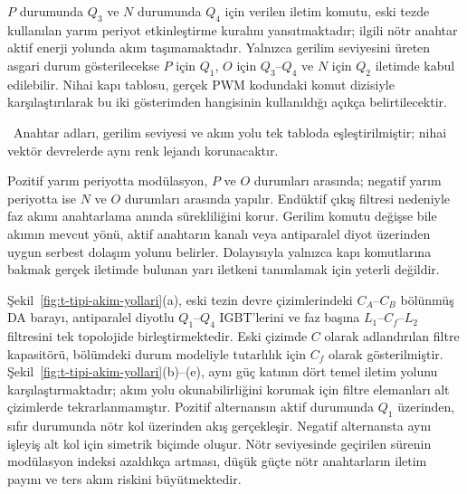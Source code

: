 $P$ durumunda $Q_3$ ve $N$ durumunda $Q_4$ için verilen iletim komutu, eski tezde kullanılan yarım periyot etkinleştirme kuralını yansıtmaktadır; ilgili nötr anahtar aktif enerji yolunda akım taşımamaktadır. Yalnızca gerilim seviyesini üreten asgari durum gösterilecekse $P$ için $Q_1$, $O$ için $Q_3$--$Q_4$ ve $N$ için $Q_2$ iletimde kabul edilebilir. Nihai kapı tablosu, gerçek PWM kodundaki komut dizisiyle karşılaştırılarak bu iki gösterimden hangisinin kullanıldığı açıkça belirtilecektir.

\begin{center}
\juriistegietiketi\ \small Anahtar adları, gerilim seviyesi ve akım yolu tek tabloda eşleştirilmiştir; nihai vektör devrelerde aynı renk lejandı korunacaktır.
\end{center}

Pozitif yarım periyotta modülasyon, $P$ ve $O$ durumları arasında; negatif yarım periyotta ise $N$ ve $O$ durumları arasında yapılır. Endüktif çıkış filtresi nedeniyle faz akımı anahtarlama anında sürekliliğini korur. Gerilim komutu değişse bile akımın mevcut yönü, aktif anahtarın kanalı veya antiparalel diyot üzerinden uygun serbest dolaşım yolunu belirler. Dolayısıyla yalnızca kapı komutlarına bakmak gerçek iletimde bulunan yarı iletkeni tanımlamak için yeterli değildir.

Şekil~\ref{fig:t-tipi-akim-yollari}(a), eski tezin devre çizimlerindeki $C_A$--$C_B$ bölünmüş DA barayı, antiparalel diyotlu $Q_1$--$Q_4$ IGBT'lerini ve faz başına $L_1$--$C_f$--$L_2$ filtresini tek topolojide birleştirmektedir. Eski çizimde $C$ olarak adlandırılan filtre kapasitörü, bölümdeki durum modeliyle tutarlılık için $C_f$ olarak gösterilmiştir. Şekil~\ref{fig:t-tipi-akim-yollari}(b)--(e), aynı güç katının dört temel iletim yolunu karşılaştırmaktadır; akım yolu okunabilirliğini korumak için filtre elemanları alt çizimlerde tekrarlanmamıştır. Pozitif alternansın aktif durumunda $Q_1$ üzerinden, sıfır durumunda nötr kol üzerinden akış gerçekleşir. Negatif alternansta aynı işleyiş alt kol için simetrik biçimde oluşur. Nötr seviyesinde geçirilen sürenin modülasyon indeksi azaldıkça artması, düşük güçte nötr anahtarların iletim payını ve ters akım riskini büyütmektedir.

